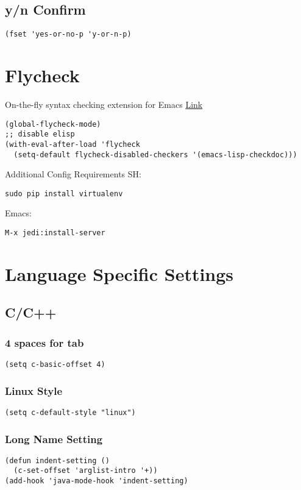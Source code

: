 \documentclass[11pt]{article}
\begin{document}
\subsection{y/n Confirm}
\label{sec-1-11}
\begin{verbatim}
(fset 'yes-or-no-p 'y-or-n-p)
\end{verbatim}
\section{Flycheck}
\label{sec-2}
On-the-fly syntax checking extension for Emacs
\href{http://www.flycheck.org/en/latest/}{Link}
\begin{verbatim}
(global-flycheck-mode)
;; disable elisp
(with-eval-after-load 'flycheck
  (setq-default flycheck-disabled-checkers '(emacs-lisp-checkdoc)))
\end{verbatim}
Additional Config Requirements
SH:
\begin{verbatim}
sudo pip install virtualenv
\end{verbatim}
Emacs:
\begin{verbatim}
M-x jedi:install-server
\end{verbatim}
\section{Language Specific Settings}
\label{sec-3}
\subsection{C/C++}
\label{sec-3-1}
\subsubsection{4 spaces for tab}
\label{sec-3-1-1}
\begin{verbatim}
(setq c-basic-offset 4)
\end{verbatim}
\subsubsection{Linux Style}
\label{sec-3-1-2}
\begin{verbatim}
(setq c-default-style "linux")
\end{verbatim}

\subsubsection{Long Name Setting}
\label{sec-3-1-3}
\begin{verbatim}
(defun indent-setting ()
  (c-set-offset 'arglist-intro '+))
(add-hook 'java-mode-hook 'indent-setting)
\end{verbatim}
\end{document}
